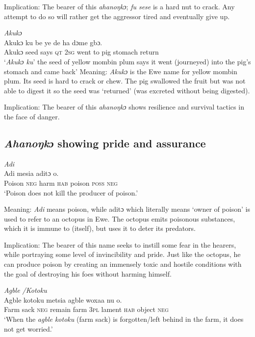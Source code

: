 \documentclass[output=paper]{langscibook}
\begin{document}
Implication: The bearer of this \textit{ahanoŋkɔ}; \textit{fu sese} is a hard nut to crack. Any attempt to do so will rather get the aggressor tired and eventually give up.

\ea \emph{Akukɔ}\\
\gll Akukɔ ku be ye de ha dɔme gbɔ.\\
Akukɔ seed {says \textsc{qt}} {\textsc{2sg} went} to pig stomach return\\
\glt  ‘{\textit{Akukɔ ku}}’ the seed of yellow mombin plum says it went (journeyed) into the pig’s stomach and came back’
\z
Meaning: \textit{Akukɔ} is the Ewe name for yellow mombin plum. Its seed is hard to crack or chew. The pig swallowed the fruit but was not able to digest it so the seed was ‘returned’ (was excreted without being digested).

Implication: The bearer of this {\textit{ahanoŋkɔ}} shows resilience and survival tactics in the face of danger.

\subsection{{\textit{Ahanoŋkɔ}} showing pride and assurance }
\ea \emph{Adi}\\
\gll Adi mesia aditɔ o.\\
Poison {\textsc{neg} harm \textsc{hab}} {poison \textsc{poss}} \textsc{neg}\\
\glt  ‘Poison does not kill the producer of poison.’
\z

\noindent Meaning: {\textit{Adi}} means poison, while aditɔ which literally means `owner of poison' is used to refer to an octopus in Ewe. The octopus emits poisonous substances, which it is immune to (itself), but uses it to deter its predators.

Implication: The bearer of this name seeks to instill some fear in the hearers, while portraying some level of invincibility and pride. Just like the octopus, he can produce poison by creating an immensely toxic and hostile conditions with the goal of destroying his foes without harming himself.


\ea \emph{Agble /Kotoku}\\
\gll Agble kotoku metsia agble woxaa nu o.\\
Farm sack {\textsc{neg} remain} farm {\textsc{3pl} lament \textsc{hab}} object \textsc{neg}\\
\glt  ‘When the {\textit{agble kotoku}} (farm sack) is forgotten/left behind in the farm, it does not get worried.’
\z
\end{document}
